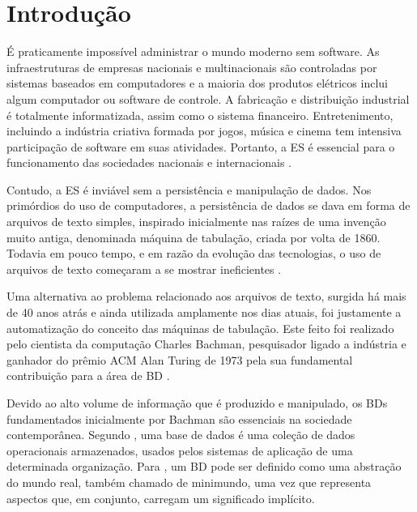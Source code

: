 \chapter{Introdução}\label{introducao}

É praticamente impossível administrar o mundo moderno sem software. 
As infraestruturas de empresas nacionais e multinacionais são controladas por sistemas baseados em computadores e a maioria dos produtos elétricos inclui algum computador ou software de controle. 
A fabricação e distribuição industrial é totalmente informatizada, assim como o sistema financeiro. 
Entretenimento, incluindo a indústria criativa formada por jogos, música e cinema tem intensiva participação de software em suas atividades. 
Portanto, a \ac{ES} é essencial para o funcionamento das sociedades nacionais e internacionais \cite{Sommerville:2011}.

Contudo, a \ac{ES} é inviável sem a persistência e manipulação de dados. 
Nos primórdios do uso de computadores, a persistência de dados se dava em forma de arquivos de texto simples, inspirado inicialmente nas raízes de uma invenção muito antiga, denominada máquina de tabulação, criada por volta de 1860. 
Todavia em pouco tempo, e em razão da evolução das tecnologias, o uso de arquivos de texto começaram a se mostrar ineficientes \cite{Silberschatz:1999}. 

Uma alternativa ao problema relacionado aos arquivos de texto, surgida há mais de 40 anos atrás e ainda utilizada amplamente nos dias atuais, foi justamente a automatização do conceito das máquinas de tabulação. 
Este feito foi realizado pelo cientista da computação Charles Bachman, pesquisador ligado a indústria e ganhador do prêmio ACM Alan Turing de 1973 pela sua fundamental contribuição para a área de \ac{BD} \cite{Krishna:1992}.

Devido ao alto volume de informação que é produzido e manipulado, os \acp{BD} fundamentados inicialmente por Bachman são essenciais na sociedade contemporânea. 
Segundo , uma base de dados é uma coleção de dados operacionais armazenados, usados pelos sistemas de aplicação de uma determinada organização. 
Para , um \ac{BD} pode ser definido como uma abstração do mundo real, também chamado de minimundo, uma vez que representa aspectos que, em conjunto, carregam um significado implícito.

